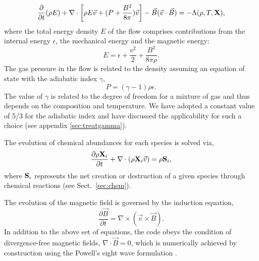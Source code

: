 \documentclass[useAMS,usenatbib]{mn2e}
\begin{document}
\begin{equation}\label{encons1}
\frac{\partial}{\partial t}(\rho E)
+ \nabla \cdot\left[ \rho E \vec{v} + (P + \frac{B^2}{8\pi})\vec{v}\right]  
- \vec{B}(\vec{v}\cdot\vec{B}) = -\Lambda(\rho,T,{\bf{X}}),
\end{equation}
%
%
where the total energy density $E$ of the flow comprises contributions from 
the internal energy $\epsilon$, the mechanical energy and the magnetic energy:
%
\begin{equation}\label{encons2}
 E = \epsilon + \frac{v^2}{2} + \frac{B^2}{8 \pi \rho}.
\end{equation}
The gas pressure in the flow is related to the density assuming an equation 
of state with the adiabatic index $\gamma$,
%
\begin{equation}\label{EOS}
P = (\gamma - 1) \rho \epsilon.
\end{equation}
The value of $\gamma$ is related to the degree of freedom for a
mixture of gas and thus depends on the composition and temperature.
We have adopted a constant value of 5/3 for the adiabatic index and
have discussed the applicability for such a choice (see appendix \ref{sec:treatgamma}).

The evolution of chemical abundances for each species is solved via,
%
\begin{equation}\label{chemevol}
\frac{\partial \rho{\bf{X}}_{i}}{\partial t} + \nabla \cdot (\rho
{\bf{X}}_{i} \vec{v})  = \rho {\bf{S}}_{i},
\end{equation}
where ${\bf{S}}_{i}$ represents the net creation or destruction of a
given species through chemical reactions (see Sect.~\ref{sec:chem}).

The evolution of the magnetic field is governed by the induction equation,
%
\begin{equation}\label{induction}
\frac{\partial \vec{B}}{\partial t} = \nabla \times \left(\vec{v}\times \vec{B}\right).
\end{equation}
%
In addition to the above set of equations, the code obeys the condition of divergence-free 
magnetic fields, $\nabla \cdot \vec{B} = 0$, which is numerically achieved by construction 
using the Powell's eight wave formulation \citep{Powell:1999p14822}.
\end{document}
